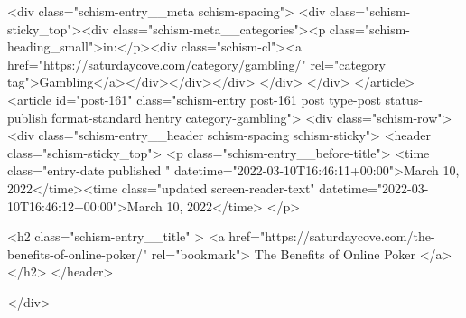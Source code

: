 {		<div class="schism-entry__meta schism-spacing">			<div class="schism-sticky_top"><div class="schism-meta__categories"><p class="schism-heading_small">in:</p><div class="schism-cl"><a href="https://saturdaycove.com/category/gambling/" rel="category tag">Gambling</a></div></div></div>		</div>
	</div>
</article>
<article id="post-161" class="schism-entry post-161 post type-post status-publish format-standard hentry category-gambling">
	<div class="schism-row">		<div class="schism-entry__header schism-spacing schism-sticky">			<header class="schism-sticky_top">				<p class="schism-entry__before-title">
					<time class="entry-date published " datetime="2022-03-10T16:46:11+00:00">March 10, 2022</time><time class="updated screen-reader-text" datetime="2022-03-10T16:46:12+00:00">March 10, 2022</time>				</p>

				<h2 class="schism-entry__title" >
					<a href="https://saturdaycove.com/the-benefits-of-online-poker/" rel="bookmark">
						The Benefits of Online Poker					</a>
				</h2>
			</header>

					</div>

}

